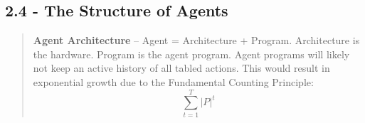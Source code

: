 \documentclass{article}
\begin{document}
\subsection{2.4 - The Structure of Agents}
\begin{quote}
    \textbf{Agent Architecture} – Agent = Architecture + Program. Architecture is the hardware. Program is the agent program. Agent programs will likely not keep an active history of all tabled actions. This would result in exponential growth due to the Fundamental Counting Principle:
    \[
        \sum_{t=1}^{T} |P|^t
    \]
\end{quote}
\end{document}
